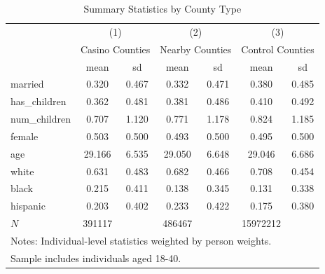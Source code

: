 \begin{table}[htbp]\centering
\def\sym#1{\ifmmode^{#1}\else\(^{#1}\)\fi}
\scriptsize
\caption{Summary Statistics by County Type}
\begin{tabular}{l*{3}{cc}}
\hline\hline
            &\multicolumn{2}{c}{(1)}  &\multicolumn{2}{c}{(2)}  &\multicolumn{2}{c}{(3)}  \\
            &\multicolumn{2}{c}{Casino Counties}&\multicolumn{2}{c}{Nearby Counties}&\multicolumn{2}{c}{Control Counties}\\
            &        mean&          sd&        mean&          sd&        mean&          sd\\
\hline
married     &       0.320&       0.467&       0.332&       0.471&       0.380&       0.485\\
has\_children&       0.362&       0.481&       0.381&       0.486&       0.410&       0.492\\
num\_children&       0.707&       1.120&       0.771&       1.178&       0.824&       1.185\\
female      &       0.503&       0.500&       0.493&       0.500&       0.495&       0.500\\
age         &      29.166&       6.535&      29.050&       6.648&      29.046&       6.686\\
white       &       0.631&       0.483&       0.682&       0.466&       0.708&       0.454\\
black       &       0.215&       0.411&       0.138&       0.345&       0.131&       0.338\\
hispanic    &       0.203&       0.402&       0.233&       0.422&       0.175&       0.380\\
\hline
\(N\)       &      391117&            &      486467&            &    15972212&\\
\hline\hline
\multicolumn{7}{l}{\footnotesize Notes: Individual-level statistics weighted by person weights.}\\
\multicolumn{7}{l}{\footnotesize Sample includes individuals aged 18-40.}\\
\end{tabular}
\end{table}
